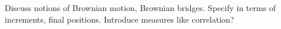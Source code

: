    Discuss notions of Brownian motion, Brownian bridges.  Specify in terms of increments,
    final positions.  Introduce measures like correlation?


